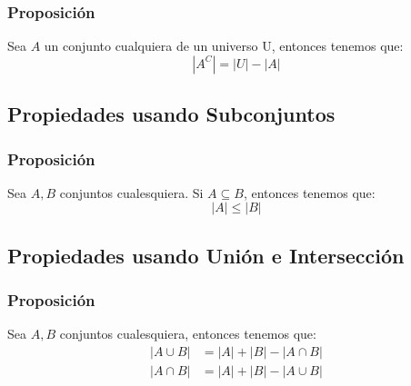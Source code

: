 \documentclass[12pt]{report}                                    %
\begin{document}
            \subsubsection{Proposición}
                Sea $A$ un conjunto cualquiera de un universo U, entonces tenemos que:
                \begin{equation*}
                    |A^C| = |U| - |A|
                \end{equation*}  

        \subsection{Propiedades usando Subconjuntos}
            
            \subsubsection{Proposición}
                Sea $A, B$ conjuntos cualesquiera. Si  $A \subseteq B$, entonces tenemos que:
                \begin{equation*}
                    |A| \leq |B|
                \end{equation*}


        \clearpage
        \subsection{Propiedades usando Unión e Intersección}
            
            \subsubsection{Proposición}
                Sea $A, B$ conjuntos cualesquiera, entonces tenemos que:
                \begin{equation*}
                \begin{split}
                    |A \cup B| &= |A| + |B| - |A \cap B|    \\  
                    |A \cap B| &= |A| + |B| - |A \cup B|  
                \end{split}
                \end{equation*}
\end{document}
